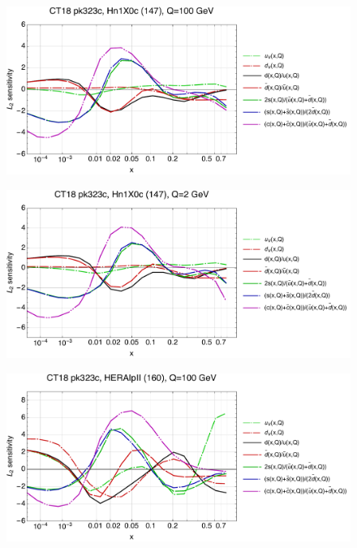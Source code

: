 \documentclass[10pt,aps,prd,floatfix,titlepage]{revtex4}
\begin{document}
\clearpage
\begin{figure}
\includegraphics[width=\textwidth,height=0.44\textheight,keepaspectratio]{2/147_ct18nn_q100_Sf_2.pdf}
\caption{}
\end{figure}
\begin{figure}
\includegraphics[width=\textwidth,height=0.44\textheight,keepaspectratio]{2/147_ct18nn_q2_Sf_2.pdf}
\caption{}
\end{figure}
\clearpage
\begin{figure}
\includegraphics[width=\textwidth,height=0.44\textheight,keepaspectratio]{2/160_ct18nn_q100_Sf_2.pdf}
\caption{}
\end{figure}
\end{document}
